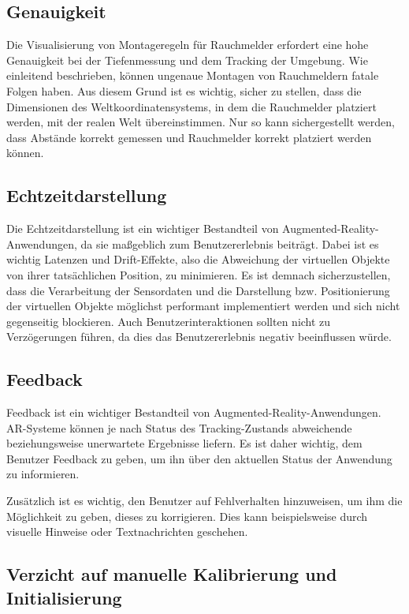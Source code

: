 \subsection{Genauigkeit}

Die Visualisierung von Montageregeln für Rauchmelder erfordert eine hohe Genauigkeit bei der Tiefenmessung und dem Tracking der Umgebung. Wie einleitend beschrieben, können ungenaue Montagen von Rauchmeldern fatale Folgen haben. Aus diesem Grund ist es wichtig, sicher zu stellen, dass die Dimensionen des Weltkoordinatensystems, in dem die Rauchmelder platziert werden, mit der realen Welt übereinstimmen. Nur so kann sichergestellt werden, dass Abstände korrekt gemessen und Rauchmelder korrekt platziert werden können.

\subsection{Echtzeitdarstellung}

Die Echtzeitdarstellung ist ein wichtiger Bestandteil von Augmented-Reality-Anwendungen, da sie maßgeblich zum Benutzererlebnis beiträgt. Dabei ist es wichtig Latenzen und Drift-Effekte, also die Abweichung der virtuellen Objekte von ihrer tatsächlichen Position, zu minimieren. Es ist demnach sicherzustellen, dass die Verarbeitung der Sensordaten und die Darstellung bzw. Positionierung der virtuellen Objekte möglichst performant implementiert werden und sich nicht gegenseitig blockieren. Auch Benutzerinteraktionen sollten nicht zu Verzögerungen führen, da dies das Benutzererlebnis negativ beeinflussen würde.

\subsection{Feedback}

Feedback ist ein wichtiger Bestandteil von Augmented-Reality-Anwendungen. AR-Systeme können je nach Status des Tracking-Zustands abweichende beziehungsweise unerwartete Ergebnisse liefern. Es ist daher wichtig, dem Benutzer Feedback zu geben, um ihn über den aktuellen Status der Anwendung zu informieren. 

Zusätzlich ist es wichtig, den Benutzer auf Fehlverhalten hinzuweisen, um ihm die Möglichkeit zu geben, dieses zu korrigieren. Dies kann beispielsweise durch visuelle Hinweise oder Textnachrichten geschehen.

\subsection{Verzicht auf manuelle Kalibrierung und Initialisierung}

